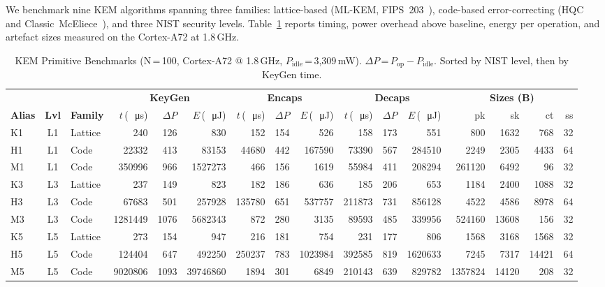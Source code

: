 \documentclass[conference]{IEEEtran}
\newcommand{\us}{\,\si{\micro\second}}
\newcommand{\uJ}{\,\si{\micro\joule}}
\begin{document}
We benchmark nine KEM algorithms spanning three families:
lattice-based (ML-KEM, FIPS~203~\cite{nist-fips203}),
code-based error-correcting (HQC~\cite{hqc} and
Classic~McEliece~\cite{mceliece}), and three NIST security
levels.  Table~\ref{tab:kem} reports timing, power overhead above
baseline, energy per operation, and artefact sizes measured on the
Cortex-A72 at 1.8\,GHz.

\begin{table}[t]
\centering
\caption{KEM Primitive Benchmarks (N\,=\,100, Cortex-A72 @ 1.8\,GHz, $P_{\text{idle}}$\,=\,3{,}309\,mW).
  $\Delta P$\,=\,$P_{\text{op}} - P_{\text{idle}}$.  Sorted by NIST level, then by KeyGen time.}
\label{tab:kem}
\footnotesize
\setlength{\tabcolsep}{3pt}
\begin{tabular}{@{}l c l  r r r  r r r  r r r  r r r r@{}}
\toprule
& & & \multicolumn{3}{c}{\textbf{KeyGen}} & \multicolumn{3}{c}{\textbf{Encaps}} & \multicolumn{3}{c}{\textbf{Decaps}} & \multicolumn{4}{c}{\textbf{Sizes (B)}} \\
\cmidrule(lr){4-6}\cmidrule(lr){7-9}\cmidrule(lr){10-12}\cmidrule(lr){13-16}
\textbf{Alias} & \textbf{Lvl} & \textbf{Family}
  & $t$\,(\si{\us}) & $\Delta P$ & $E$\,(\si{\uJ})
  & $t$\,(\si{\us}) & $\Delta P$ & $E$\,(\si{\uJ})
  & $t$\,(\si{\us}) & $\Delta P$ & $E$\,(\si{\uJ})
  & pk & sk & ct & ss \\
\midrule
\rowcolor{lvlone}
K1 & L1 & Lattice
  & 240 & 126 & 830
  & 152 & 154 & 526
  & 158 & 173 & 551
  & 800 & 1632 & 768 & 32 \\
\rowcolor{lvlone}
H1 & L1 & Code
  & 22332 & 413 & 83153
  & 44680 & 442 & 167590
  & 73390 & 567 & 284510
  & 2249 & 2305 & 4433 & 64 \\
\rowcolor{lvlone}
M1 & L1 & Code
  & 350996 & 966 & 1527273
  & 466 & 156 & 1619
  & 55984 & 411 & 208294
  & 261120 & 6492 & 96 & 32 \\
\midrule
\rowcolor{lvlthree}
K3 & L3 & Lattice
  & 237 & 149 & 823
  & 182 & 186 & 636
  & 185 & 206 & 653
  & 1184 & 2400 & 1088 & 32 \\
\rowcolor{lvlthree}
H3 & L3 & Code
  & 67683 & 501 & 257928
  & 135780 & 651 & 537757
  & 211873 & 731 & 856128
  & 4522 & 4586 & 8978 & 64 \\
\rowcolor{lvlthree}
M3 & L3 & Code
  & 1281449 & 1076 & 5682343
  & 872 & 280 & 3135
  & 89593 & 485 & 339956
  & 524160 & 13608 & 156 & 32 \\
\midrule
\rowcolor{lvlfive}
K5 & L5 & Lattice
  & 273 & 154 & 947
  & 216 & 181 & 754
  & 231 & 177 & 806
  & 1568 & 3168 & 1568 & 32 \\
\rowcolor{lvlfive}
H5 & L5 & Code
  & 124404 & 647 & 492250
  & 250237 & 783 & 1023984
  & 392585 & 819 & 1620633
  & 7245 & 7317 & 14421 & 64 \\
\rowcolor{lvlfive}
M5 & L5 & Code
  & 9020806 & 1093 & 39746860
  & 1894 & 301 & 6849
  & 210143 & 639 & 829782
  & 1357824 & 14120 & 208 & 32 \\
\bottomrule
\end{tabular}
\end{table}
\end{document}
